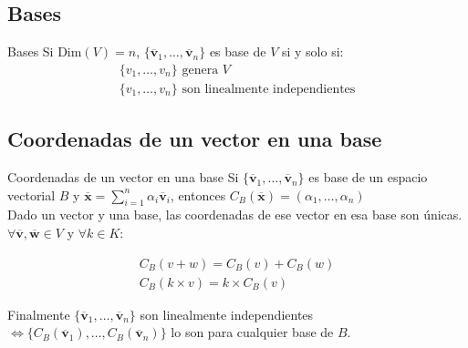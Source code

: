 \documentclass[a4paper, twoside]{article}
\numberwithin{equation}{section}
\numberwithin{figure}{section}
\numberwithin{table}{section}
\newcommand{\vect}[1]{\overline{\textbf{#1}}}
\newcommand{\dime}[1]{\text{Dim}(#1)}
\begin{document}
\subsection{Bases}
\begin{definicion*}{Bases}
	Si $\dime{V}=n$, $\{\vect{v}_1,\ldots,\vect{v}_n \}$ es base de $V$ si y solo si:
	\begin{align}
		\{v_1,\ldots,v_n \} \text{ genera } V \\
		 \{v_1,\ldots,v_n \} \text{ son linealmente independientes}
	\end{align}
\end{definicion*}

\subsection{Coordenadas de un vector en una base}
\begin{definicion*}{Coordenadas de un vector en una base}
	Si $\{\vect{v}_1,\ldots,\vect{v}_n \}$ es base de un espacio vectorial $B$ y $\vect{x}=\sum_{i=1}^n \alpha_i \vect{v}_i$, entonces $C_B(\vect{x})=(\alpha_1,\ldots,\alpha_n)$ \\
	
	Dado un vector y una base, las coordenadas de ese vector en esa base son únicas.\\
	
	$\forall \vect{v},\vect{w} \in V$ y $\forall k \in K$:
	
	\begin{align}
		C_B(v+w)=C_B(v)+C_B(w) \\
		C_B(k \times v)=k \times C_B(v)
	\end{align}
	
	Finalmente $\{\vect{v}_1,\ldots,\vect{v}_n \}$ son linealmente independientes $\Longleftrightarrow \{C_B(\vect{v}_1),\ldots,C_B(\vect{v}_n) \}$ lo son para cualquier base de $B$.
\end{definicion*}
\end{document}
